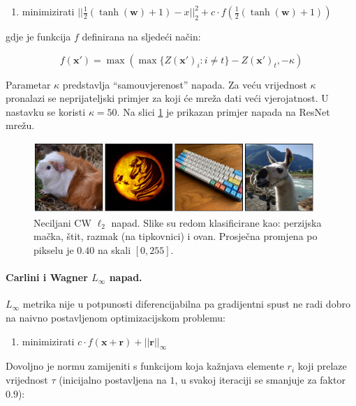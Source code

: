 \documentclass[utf8, diplomski]{fer}
\begin{document}
\begin{enumerate}[noitemsep, label=\textbullet]
  \item minimizirati $||\frac{1}{2}(\tanh(\boldsymbol{w}) + 1) - x||_{2}^{2} + c \cdot f(\frac{1}{2}(\tanh(\boldsymbol{w}) + 1))$
\end{enumerate}

gdje je funkcija $f$ definirana na sljedeći način:

\begin{equation}
f(\boldsymbol{x}') = \max(\max\{Z(\boldsymbol{x}')_{i} : i \neq t\} - Z(\boldsymbol{x}')_{t}, -\kappa)
\end{equation}

Parametar $\kappa$ predstavlja ``samouvjerenost'' napada. Za veću vrijednost $\kappa$ pronalazi se neprijateljski primjer za koji će mreža dati veći vjerojatnost. U nastavku se koristi $\kappa = 50$. Na slici \ref{fig:carlini_l2} je prikazan primjer napada na ResNet mrežu.

\begin{figure}[H]
\centering
\includegraphics[width=0.95\textwidth,keepaspectratio]{img/results/carlini_l2.png}
\caption{Neciljani CW $\ell_{2}$ napad. Slike su redom klasificirane kao: perzijska mačka, štit, razmak (na tipkovnici) i ovan. Prosječna promjena po pikselu je $0.40$ na skali $[0, 255]$.}
\label{fig:carlini_l2}
\end{figure}


\paragraph{Carlini i Wagner $L_{\infty}$ napad.} 
$L_{\infty}$ metrika nije u potpunosti diferencijabilna pa gradijentni spust ne radi dobro na naivno postavljenom optimizacijskom problemu:

\begin{enumerate}[noitemsep, label=\textbullet]
  \item minimizirati $c \cdot f(\boldsymbol{x} + \boldsymbol{r}) + ||\boldsymbol{r}||_{\infty}$
\end{enumerate}

Dovoljno je normu zamijeniti s funkcijom koja kažnjava elemente $r_{i}$ koji prelaze vrijednost $\tau$ (inicijalno postavljena na $1$, u svakoj iteraciji se smanjuje za faktor $0.9$):
\end{document}

